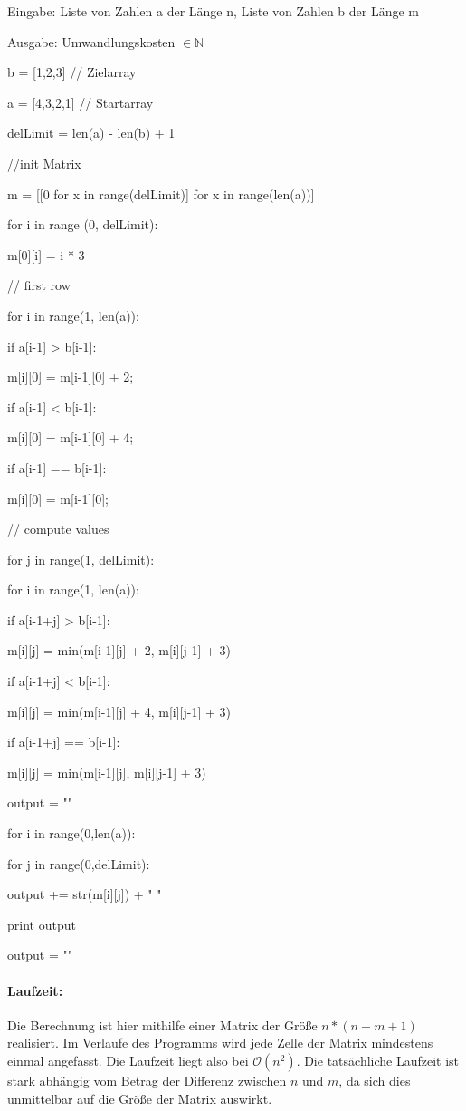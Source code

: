 \documentclass[12pt]{scrartcl}%
\theoremstyle{nonumberplain}
\newcommand{\N}{\mathbb{N}}
\newcommand{\bO}[1]{\mathcal O(#1)}
\begin{document}
Eingabe: Liste von Zahlen a der Länge n, Liste von Zahlen b der Länge m

Ausgabe: Umwandlungskosten $\in \N$

b = [1,2,3] // Zielarray

a = [4,3,2,1] // Startarray

delLimit = len(a) - len(b) + 1

//init Matrix

m = [[0 for x in range(delLimit)] for x in range(len(a))]

for i in range (0, delLimit):

	m[0][i] = i * 3

// first row

for i in range(1, len(a)):

	if a[i-1] > b[i-1]:
	
		m[i][0] = m[i-1][0] + 2;
		
	if a[i-1] < b[i-1]:
	
		m[i][0] = m[i-1][0] + 4;
		
	if a[i-1] == b[i-1]:
	
		m[i][0] = m[i-1][0];

// compute values

for j in range(1, delLimit):

	for i in range(1, len(a)):
	
		if a[i-1+j] > b[i-1]:
		
			m[i][j] = min(m[i-1][j] + 2, m[i][j-1] + 3)
			
		if a[i-1+j] < b[i-1]:
		
			m[i][j] = min(m[i-1][j] + 4, m[i][j-1] + 3)
			
		if a[i-1+j] == b[i-1]:
		
			m[i][j] = min(m[i-1][j], m[i][j-1] + 3)

output = ""

for i in range(0,len(a)):

	for j in range(0,delLimit):
	
		output += str(m[i][j]) + " "
		
	print output
	
	output = ""
	

\paragraph{Laufzeit:} Die Berechnung ist hier mithilfe einer Matrix der Größe $n * (n-m+1)$ realisiert. Im Verlaufe des Programms wird jede Zelle der Matrix mindestens einmal angefasst. Die Laufzeit liegt also bei $\bO{n^2}$. Die tatsächliche Laufzeit ist stark abhängig vom Betrag der Differenz zwischen $n$ und $m$, da sich dies unmittelbar auf die Größe der Matrix auswirkt.
\end{document}
